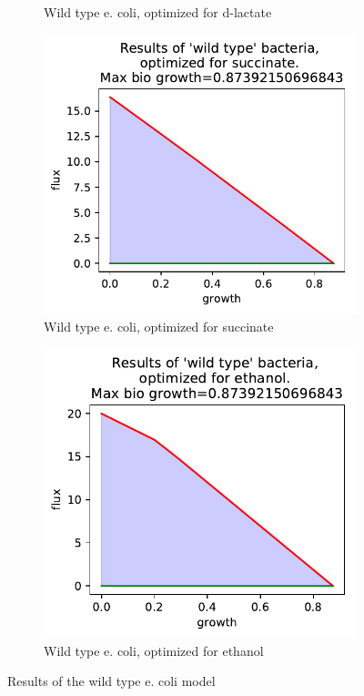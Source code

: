 \documentclass{scrartcl}
\begin{document}
\begin{figure}[h]
\begin{subfigure}{.49\textwidth}
         \caption{Wild type e. coli, optimized for d-lactate}
         \label{fig:d-lactate_wild_type}
      \end{subfigure}
      \begin{subfigure}{.49\textwidth}
         \centering
         \includegraphics[width=\linewidth]{q1_results/result_q1_succinate_wild_type.pdf}
         \caption{Wild type e. coli, optimized for succinate}
         \label{fig:succinate_wild_type}
      \end{subfigure}
      \begin{subfigure}{.49\textwidth}
         \centering
         \includegraphics[width=\linewidth]{q1_results/result_q1_ethanol_wild_type.pdf}
         \caption{Wild type e. coli, optimized for ethanol}
         \label{fig:ethanol_wild_type}
      \end{subfigure}
      \caption{Results of the wild type e. coli model}
      \label{fig:results_wild_type}
   \end{figure}
   
\end{document}

